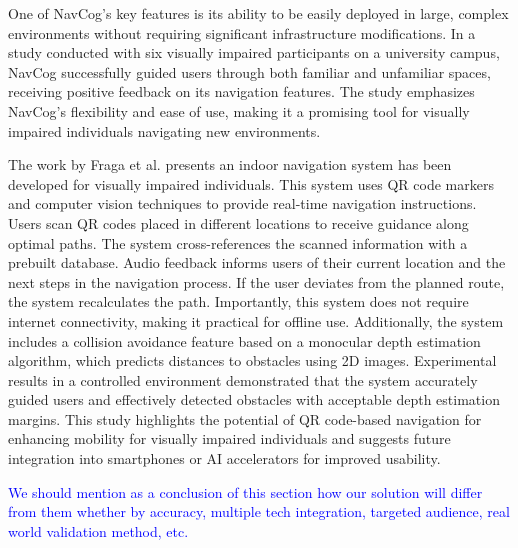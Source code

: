 One of NavCog's key features is its ability to be easily deployed in large, complex environments without requiring significant infrastructure modifications. In a study conducted with six visually impaired participants on a university campus, NavCog successfully guided users through both familiar and unfamiliar spaces, receiving positive feedback on its navigation features. The study emphasizes NavCog’s flexibility and ease of use, making it a promising tool for visually impaired individuals navigating new environments.


The work by Fraga et al. \cite{fraga2022} presents an indoor navigation system has been developed for visually impaired individuals. This system uses QR code markers and computer vision techniques to provide real-time navigation instructions. Users scan QR codes placed in different locations to receive guidance along optimal paths. The system cross-references the scanned information with a prebuilt database. Audio feedback informs users of their current location and the next steps in the navigation process. If the user deviates from the planned route, the system recalculates the path. Importantly, this system does not require internet connectivity, making it practical for offline use. Additionally, the system includes a collision avoidance feature based on a monocular depth estimation algorithm, which predicts distances to obstacles using 2D images. Experimental results in a controlled environment demonstrated that the system accurately guided users and effectively detected obstacles with acceptable depth estimation margins. This study highlights the potential of QR code-based navigation for enhancing mobility for visually impaired individuals and suggests future integration into smartphones or AI accelerators for improved usability.


\textcolor{blue}{We should mention as a conclusion of this section how our solution will differ from them whether by accuracy, multiple tech integration, targeted audience, real world validation method, etc.}